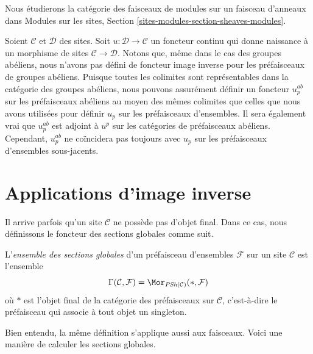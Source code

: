 \noindent
Nous étudierons la catégorie des faisceaux de modules sur un faisceau d'anneaux dans
Modules sur les sites, Section \ref{sites-modules-section-sheaves-modules}.

\begin{remark}
\label{remark-no-pullback-presheaves}
Soient $\mathcal{C}$ et $\mathcal{D}$ des sites.
Soit $u : \mathcal{D} \to \mathcal{C}$ un foncteur continu
qui donne naissance à un morphisme de sites $\mathcal{C} \to \mathcal{D}$.
Notons que, même dans le cas des groupes abéliens, nous n'avons pas défini
de foncteur image inverse pour les préfaisceaux de groupes abéliens.
Puisque toutes les colimites sont représentables dans
la catégorie des groupes abéliens, nous pouvons assurément définir
un foncteur $u_p^{ab}$ sur les préfaisceaux abéliens au moyen des mêmes colimites
que celles que nous avons utilisées pour définir $u_p$ sur les préfaisceaux d'ensembles.
Il sera également vrai que $u_p^{ab}$ est adjoint à
$u^p$ sur les catégories de préfaisceaux abéliens.
Cependant, $u_p^{ab}$ ne coïncidera pas toujours avec
$u_p$ sur les préfaisceaux d'ensembles sous-jacents.
\end{remark}












\section{Applications d'image inverse}
\label{section-pullback}

\noindent
Il arrive parfois qu'un site $\mathcal{C}$ ne possède
pas d'objet final. Dans ce cas, nous définissons le
foncteur des sections globales comme suit.

\begin{definition}
\label{definition-global-sections}
L'{\it ensemble des sections globales} d'un préfaisceau d'ensembles $\mathcal{F}$ sur un
site $\mathcal{C}$ est l'ensemble
$$
\Gamma(\mathcal{C}, \mathcal{F}) =
\Mor_{\textit{PSh}(\mathcal{C})}(*, \mathcal{F})
$$
où $*$ est l'objet final de la catégorie des préfaisceaux sur
$\mathcal{C}$, c'est-à-dire le préfaisceau qui associe à tout objet
un singleton.
\end{definition}

\noindent
Bien entendu, la même définition s'applique aussi aux faisceaux.
Voici une manière de calculer les sections globales.

